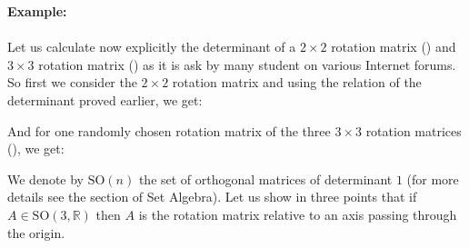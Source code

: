 	\pagebreak
	\begin{tcolorbox}[colframe=black,colback=white,sharp corners]
	\textbf{{\Large {}}Example:}\\\\
	Let us calculate now explicitly the determinant of a $2\times 2$ rotation matrix () and $3\times 3$ rotation matrix () as it is ask by many student on various Internet forums.\\

	So first we consider the $2\times 2$ rotation matrix and using the relation of the determinant proved earlier, we get:
	
	And for one randomly chosen rotation matrix of the three $3\times 3$ rotation matrices (), we get:
		
	\end{tcolorbox}
	
	We denote by $\text{SO}(n)$ the set of orthogonal matrices of determinant $1$ (for more details see the section of Set Algebra). Let us show in three points that if $A\in \text{SO}(3,\mathbb{R})$  then $A$ is the rotation matrix relative to an axis passing through the origin.
	
